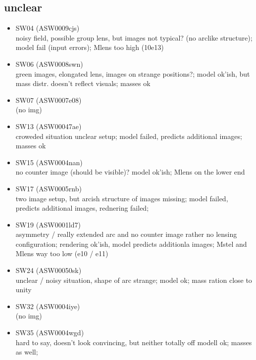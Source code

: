 \documentclass[fleqn,usenatbib]{mnras}
\begin{document}
\subsection{unclear}
\begin{itemize}
  \item SW04 (ASW0009cjs) \\
  noisy field, possible group lens, but images not typical? (no arclike structure);
  model fail (input errors);
  Mlens too high (10e13)
  
  \item SW06 (ASW0008swn)\\
  green images, elongated lens, images on strange positions?;
  model ok'ish, but mass distr. doesn't reflect visuals;
  masses ok
  
  \item SW07 (ASW0007e08) \\
  (no img)
  
  \item SW13 (ASW00047ae) \\
  croweded situation unclear setup;
  model failed, predicts additional images;
  masses ok
  
  \item SW15 (ASW0004nan) \\
  no counter image (should be visible)?
  model ok'ish;
  Mlens on the lower end
  
  \item SW17 (ASW0005rnb) \\
  two image setup, but arcish structure of images missing;
  model failed, predicts additional images, rednering failed;
  
  \item SW19 (ASW0001ld7) \\
  asymmetry / really extended arc and no counter image rather no lensing configuration;
  rendering ok'ish, model predicts additionla images;
  Mstel and Mlens way too low (e10 / e11)
  
  \item SW24 (ASW00050sk) \\
  unclear / noisy situation, shape of arc strange;
  model ok;
  mass ration close to unity
  
  \item SW32 (ASW0004iye) \\
  (no img)
  
  \item SW35 (ASW0004wgd) \\
  hard to say, doesn't look convincing, but neither totally off
  modell ok;
  masses as well;
  

\end{itemize}
\end{document}
